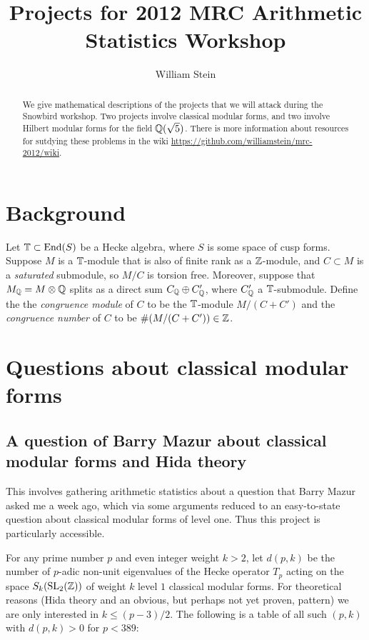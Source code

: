 \documentclass{article}
\title{Projects for 2012 MRC Arithmetic Statistics Workshop}
\author{William Stein}
\begin{document}
\maketitle
\begin{abstract}
  We give mathematical descriptions of the projects that we will
  attack during the Snowbird workshop.  Two projects involve classical
  modular forms, and two involve Hilbert modular forms for the field
  $\mathbb{Q}(\sqrt{5})$. There is more information about resources for
  sutdying these problems in the wiki
  \url{https://github.com/williamstein/mrc-2012/wiki}.
\end{abstract}

\tableofcontents

\section*{Background}

Let $\mathbb{T} \subset \operatorname{End}(S)$ be a Hecke algebra, where $S$ is some space
of cusp forms.  Suppose $M$ is a $\mathbb{T}$-module that is also of finite
rank as a $\mathbb{Z}$-module, and $C\subset M$ is a {\em saturated}
submodule, so $M/C$ is torsion free.  Moreover, suppose that $M_{\mathbb{Q}} =
M\otimes\mathbb{Q}$ splits as a direct sum $C_{\mathbb{Q}} \oplus C'_{\mathbb{Q}}$, where
$C'_{\mathbb{Q}}$ a $\mathbb{T}$-submodule.  Define the the {\em congruence module} of
$C$ to be the $\mathbb{T}$-module $M/(C+C')$ and the {\em congruence number}
of $C$ to be $\#(M/(C +C')) \in \mathbb{Z}$.  

\section{Questions about classical modular forms}

\subsection{A question of Barry Mazur about classical modular forms and Hida theory}

This involves gathering arithmetic statistics about a question that
Barry Mazur asked me a week ago, which via some arguments reduced to 
an easy-to-state question about classical modular forms of level one.
Thus this project is particularly accessible.

For any prime number $p$ and even integer weight $k>2$, let $d(p,k)$
be the number of $p$-adic non-unit eigenvalues of the Hecke operator
$T_p$ acting on the space $S_k(\operatorname{SL}_2(\mathbb{Z}))$ of weight $k$ level $1$
classical modular forms.  For theoretical reasons (Hida theory and an
obvious, but perhaps not yet proven, pattern) we are only interested
in $k\leq (p-3)/2$.  The following is a table of all such
$(p,k)$ with $d(p,k)>0$ for $p<389$:
\end{document}
